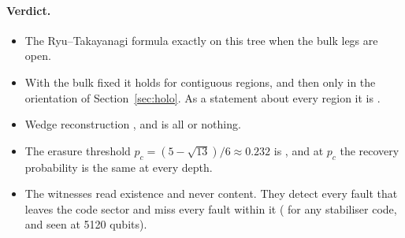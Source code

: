 \paragraph{Verdict.}
\begin{itemize}[nosep]
\item The Ryu--Takayanagi formula  exactly on this tree when the bulk legs are open.
\item With the bulk fixed it holds for contiguous regions, and then only in the orientation of Section~\ref{sec:holo}. As a statement
  about every region it is .
\item Wedge reconstruction , and is all or nothing.
\item The erasure threshold $p_c=(5-\sqrt{13})/6\approx0.232$ is , and at $p_c$ the recovery probability is the same at
  every depth.
\item The witnesses read existence and never content. They detect every fault that leaves the code sector and miss every fault within
  it ( for any stabiliser code, and seen at 5120 qubits).
\end{itemize}
